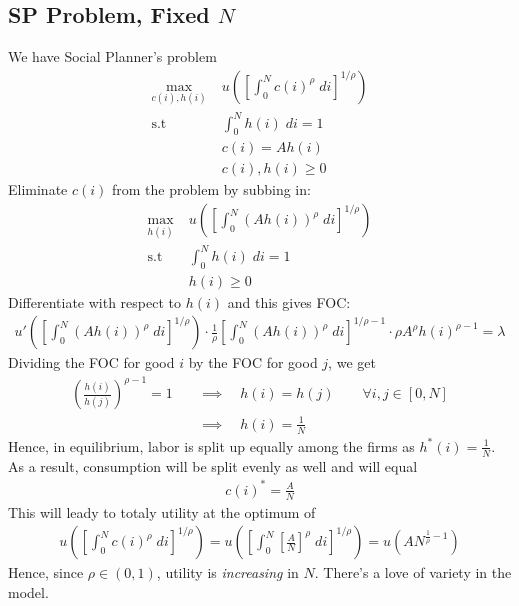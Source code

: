 \documentclass[12pt]{article}
\theoremstyle{plain}
\theoremstyle{definition}
\theoremstyle{remark}
\newcommand{\intzN}{\int_0^N}
\begin{document}
\clearpage
\subsection{SP Problem, Fixed $N$}

We have Social Planner's problem
\begin{align*}
  \max_{c(i), h(i)}
    & \; u\left(
      \left[ \int_0^N c(i)^\rho \; di \right]^{1/\rho}
    \right)\\
  \text{s.t} & \;
  \intzN h(i) \; di = 1 \\
  &\; c(i) = Ah(i) \\
  &\; c(i),h(i) \geq 0
\end{align*}
Eliminate $c(i)$ from the problem by subbing in:
\begin{align*}
  \max_{h(i)}
    & \; u\left(
    \left[ \int_0^N (Ah(i))^\rho \; di \right]^{1/\rho}
    \right)\\
  \text{s.t} & \;
  \intzN h(i) \; di = 1 \\
  &\; h(i) \geq 0
\end{align*}
Differentiate with respect to $h(i)$ and this gives FOC:
\begin{align*}
  u'\left( \left[ \int_0^N (Ah(i))^\rho \; di \right]^{1/\rho} \right)
  \cdot
  \frac{1}{\rho}\left[ \int_0^N (Ah(i))^\rho \; di \right]^{1/\rho-1}
  \cdot
  \rho A^\rho h(i)^{\rho-1}
  = \lambda
\end{align*}
Dividing the FOC for good $i$ by the FOC for good $j$, we get
\begin{align*}
  \left(
  \frac{h(i)}{h(j)}
  \right)^{\rho-1}
  = 1
  \quad&\implies\quad
  h(i) = h(j)
  \qquad \forall i,j \in[0,N] \\
  &\implies\quad
  h(i) = \frac{1}{N}
\end{align*}
Hence, in equilibrium, labor is split up equally among the firms as
$h^*(i)=\frac{1}{N}$. As a result, consumption will be split evenly as
well and will equal
\begin{align*}
  c(i)^* = \frac{A}{N}
\end{align*}
This will leady to totaly utility at the optimum of
\begin{align*}
  u\left( \left[ \int_0^N c(i)^\rho \; di \right]^{1/\rho} \right)
  =
  u\left( \left[ \int_0^N
      \left[ \frac{A}{N} \right]^\rho \; di
    \right]^{1/\rho} \right)
  =
  u\left( A N^{\frac{1}{\rho}-1}\right)
\end{align*}
Hence, since $\rho\in(0,1)$, utility is \emph{increasing} in $N$.
There's a love of variety in the model.
\end{document}

